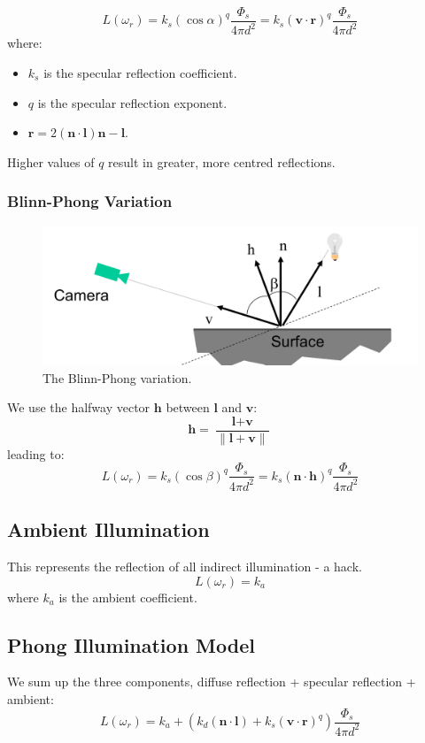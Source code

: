 \documentclass[11pt]{article}
\begin{document}
\[
  L(\omega_r) = k_s(\cos \alpha)^q \frac{\Phi_s}{4\pi d^2} = k_s (\textbf{v} \cdot \textbf{r})^q \frac{\Phi_s}{4\pi d^2} 
\]
where:
\begin{itemize}
  \item $k_s$ is the specular reflection coefficient.
  \item $q$ is the specular reflection exponent.
  \item $\textbf{r} = 2(\textbf{n} \cdot \textbf{l}) \textbf{n} - \textbf{l}$.
\end{itemize}

Higher values of $q$ result in greater, more centred reflections.

\subsubsection{Blinn-Phong Variation}
\begin{figure}[htb!]
  \centering
  \caption{The Blinn-Phong variation.}
  \includegraphics[scale=0.3]{blinnphong}
\end{figure}
We use the halfway vector $\textbf{h}$ between $\textbf{l}$ and $\textbf{v}$:
\[
  \textbf{h} = \frac{\textbf{l} + \textbf{v}}{\lVert \textbf{l} + \textbf{v} \rVert} 
\]
leading to:
\[
  L(\omega_r) = k_s(\cos \beta)^q \frac{\Phi_s}{4\pi d^2} = k_s (\textbf{n} \cdot \textbf{h})^q \frac{\Phi_s}{4\pi d^2} 
\]

\subsection{Ambient Illumination}
This represents the reflection of all indirect illumination - a hack.
\[
  L(\omega_r) = k_a 
\]
where $k_a$ is the ambient coefficient.

\subsection{Phong Illumination Model}
We sum up the three components, diffuse reflection + specular reflection + ambient:
\[
  L(\omega_r) = k_a + (k_d (\textbf{n} \cdot \textbf{l}) + k_s (\textbf{v} \cdot \textbf{r})^q) \frac{\Phi_s}{4\pi d^2} 
\]
\end{document}
